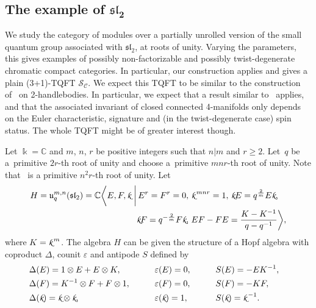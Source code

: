 \documentclass[10pt,a4paper]{amsart}
\numberwithin{equation}{section}
\newcommand{\smk}{{\fontfamily{pzc}\selectfont \text{k}}}
\numberwithin{theorem}{section}
\numberwithin{proposition}{section}
\numberwithin{definition}{section}
\numberwithin{lemma}{section}
\numberwithin{corollary}{section}
\numberwithin{remark}{section}
\numberwithin{example}{section}
\newcommand{\cat}{\mathcal{C}}
\newcommand{\C}{\ensuremath{\mathbb{C}}}
\newcommand{\FK}{{\Bbbk}}
\newcommand{\TSkein}{{\mathscr{S}}}
\begin{document}
\subsection[The example of sl\_2]{The example of $\boldsymbol{\mathfrak{sl}_2}$}\label{SS:Ex-sl2}
We study the category of modules over a partially unrolled version of
the small quantum group associated with $\mathfrak{sl}_2$, at roots of
unity. Varying the parameters, this gives examples of possibly
non-factorizable and possibly twist-degenerate chromatic compact
categories. In particular, our construction applies and gives a plain
(3+1)-TQFT $\TSkein_\cat$. We expect this TQFT to be similar to the
construction of~\cite[Section 9.2]{BD21} on 2-handlebodies. In
particular, we expect that a result similar to~\cite[Theorem
8.1]{BD22} applies, and that the associated invariant of closed
connected 4-manifolds only depends on the Euler characteristic,
signature and (in the twist-degenerate case) spin status. The whole
TQFT might be of greater interest though.
\newcommand{\pp}{r}
\begin{definition}
 Let $\FK=\C$ and $m$, $n$, $r$ be positive integers such that $n\vert m$
 and $r\ge2$.
 Let~$q$ be a~primitive $2r$-th
 root of unity and choose  a~primitive $mn{\pp}$-th root
 of unity. Note that~
 is a primitive
 $n^2{\pp}$-th root of unity. Let
 \begin{align*}
 &H=\mathfrak{u}^{m,n}_{q}(\mathfrak{sl}_2)
 = \C\biggl\langle E,F,{\smk} \ \bigg|\,
 E^{{\pp}}=F^{{\pp}}=0,\, \smk^{\,mn{\pp}}=1, \,\smk E=q^\frac{2}{m}E\smk, \\
& \hphantom{H=\mathfrak{u}^{m,n}_{q}(\mathfrak{sl}_2)
 = \C\biggl\langle E,F,\smk \,\bigg|\, }{}
 \smk
 F=q^{-\frac{2}{m}}F\smk,\, EF-FE=\frac{K-K^{-1}}{q-q^{-1}} \biggr\rangle,
 \end{align*}
 where $K=\smk^{\, m}$.
 The algebra $H$ can be given the structure of a Hopf algebra with coproduct $\Delta$, counit $\varepsilon$ and antipode $S$ defined by
\begin{alignat*}{4}
&\Delta(E)=1\otimes E + E \otimes K,\qquad && \varepsilon(E)=0,\qquad && S(E)= -EK^{-1},&\\
&\Delta(F)= K^{-1}\otimes F+F\otimes 1,\qquad && \varepsilon(F)=0,\qquad && S(F)=-KF,&\\
&\Delta(\smk)= \smk\otimes \smk,\qquad && \varepsilon(\smk)=1,\qquad && S(\smk)=\smk^{\,-1}.&
 \end{alignat*}
 \end{definition}
\end{document}
